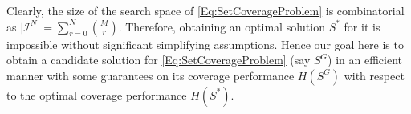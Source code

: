 \documentclass[letterpaper, 10 pt, conference]{ieeeconf}
\newtheorem{remark}{Remark}
\begin{document}






Clearly, the size of the search space of \eqref{Eq:SetCoverageProblem} is combinatorial as $\vert \mathcal{I}^N \vert = \sum_{r=0}^N {M \choose r}$. 
Therefore, obtaining an optimal solution $S^*$ for it is impossible without significant simplifying assumptions. Hence our goal here is to obtain a candidate solution for \eqref{Eq:SetCoverageProblem} (say $S^G$) in an efficient manner with some guarantees on its coverage performance $H(S^G)$ with respect to the optimal coverage performance $H(S^*)$. 
\end{document}
